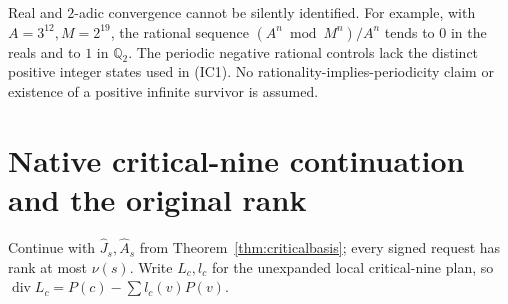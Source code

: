 \documentclass[11pt]{article}
\begin{document}
Real and $2$-adic convergence cannot be silently identified. For example,
with $A=3^{12},M=2^{19}$, the rational sequence
$(A^n\bmod M^n)/A^n$ tends to $0$ in the reals and to $1$ in
$\mathbb Q_2$. The periodic negative rational controls lack the distinct
positive integer states used in (IC1). No rationality-implies-periodicity
claim or existence of a positive infinite survivor is assumed.

\section{Native critical-nine continuation and the original rank}
Continue with $\widehat J_s,\widehat A_s$ from
Theorem~\ref{thm:criticalbasis}; every signed request has rank at most
$\nu(s)$. Write $L_c,l_c$ for the unexpanded local critical-nine plan,
so $\operatorname{div}L_c=P(c)-\sum l_c(v)P(v)$.
\end{document}
